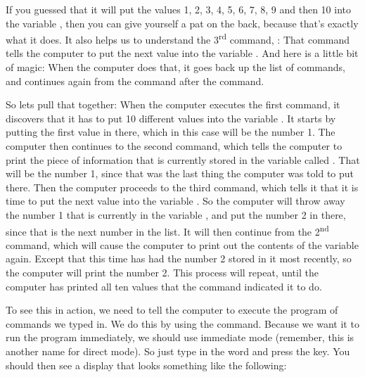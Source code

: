 If you guessed
that it will put the values 1, 2, 3, 4, 5, 6, 7, 8, 9 and then 10 into the variable , then you
can give yourself a pat on the back, because that's exactly what it does.  It also helps us to
understand the 3\textsuperscript{rd} command, : That command tells the computer to put the next value into
the variable .  And here is a little bit of magic: When the computer does that, it goes back
up the list of commands, and continues again from the command after the  command.

So lets pull that together: When the computer executes the first command, it discovers that it has
to put 10 different values into the variable . It starts by putting the first value in there, which
in this case will be the number 1.
The computer then continues to the second command, which tells the computer to print the piece of
information that is currently stored in the variable called . That will be the number 1, since
that was the last thing the computer was told to put there.  Then the computer proceeds to the
third command, which tells it that it is time to put the next value into the variable .  So the
computer will throw away the number 1 that is currently in the variable , and put the number 2 in
there, since that is the next number in the list.  It will then continue from the 2\textsuperscript{nd} command,
which will cause the computer to print out the contents of the variable  again.  Except that this
time  has had the number 2 stored in it most recently, so the computer will print the number 2.
This process will repeat, until the computer has printed all ten values that the  command
indicated it to do.

\needspace{4cm} %
To see this in action, we need to tell the computer to execute the program of commands we typed in.
We do this by using the  command. Because we want it to run the program immediately, we
should use immediate mode (remember, this is another name for direct mode).
So just type in the word  and press the  key.  You should then see a display
that looks something like the following:


